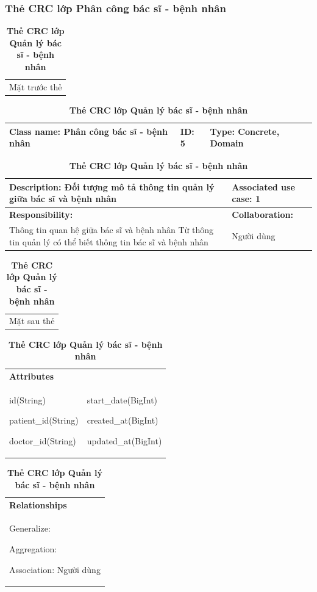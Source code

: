 \subsubsection{Thẻ CRC lớp Phân công bác sĩ - bệnh nhân}
  \begin{table}[H]
    \caption{\bfseries \fontsize{12pt}{0pt}\selectfont Thẻ CRC lớp Quản lý bác sĩ - bệnh nhân}
    \centering
    \begin{tabularx}{0.9\textwidth}{X}
      Mặt trước thẻ
    \end{tabularx}
    \begin{tabularx}{0.9\textwidth}{|X|X|X|}
      \hline
      \textbf{Class name:} Phân công bác sĩ - bệnh nhân & \textbf{ID:} 5 & \textbf{Type:} Concrete, Domain \\
      \hline
    \end{tabularx}
    \begin{tabularx}{0.9\textwidth}{|X|X|}
      \textbf{Description:} Đối tượng mô tả thông tin quản lý giữa bác sĩ và bệnh nhân & \textbf{Associated use case:} 1 \\
      \hline
      \textbf{Responsibility:} & \textbf{Collaboration:} \\
      Thông tin quan hệ giữa bác sĩ và bệnh nhân
      Từ thông tin quản lý có thể biết thông tin bác sĩ và bệnh nhân 
      & 
      Người dùng
      \\
      \hline
    \end{tabularx}
    \begin{tabularx}{0.9\textwidth}{X}
      Mặt sau thẻ
    \end{tabularx}
    \begin{tabularx}{0.9\textwidth}{|X|X|}
      \hline
      \textbf{Attributes} & \\
      id(String) 
      
      patient\_id(String)

      doctor\_id(String)
      & 
      start\_date(BigInt) 
            
      created\_at(BigInt)

      updated\_at(BigInt)
      \\
      \hline
    \end{tabularx}
    \begin{tabularx}{0.9\textwidth}{|X|}
      \textbf{Relationships} \\
      Generalize:  

      Aggregation:  
      
      Association: Người dùng 
      \\
      \hline
    \end{tabularx}
  \end{table}

